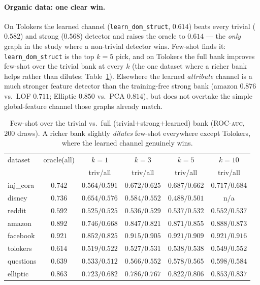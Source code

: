 \documentclass[11pt]{article}
\newcommand{\auc}{\textsc{auc}}
\begin{document}
\paragraph{Organic data: one clear win.} On Tolokers the learned channel
(\texttt{learn\_dom\_struct}, $0.614$) beats every trivial ($0.582$) and strong ($0.568$)
detector and raises the oracle to $0.614$ --- the \emph{only} graph in the study where a
non-trivial detector wins. Few-shot finds it: \texttt{learn\_dom\_struct} is the top $k{=}5$
pick, and on Tolokers the full bank improves few-shot over the trivial bank at every $k$ (the
one dataset where a richer bank helps rather than dilutes; Table~\ref{tab:fewshotbank}).
Elsewhere the learned \emph{attribute} channel is a much stronger feature detector than the
training-free strong bank (amazon $0.876$ vs.\ LOF $0.711$; Elliptic $0.850$ vs.\ PCA $0.814$),
but does not overtake the simple global-feature channel those graphs already match.

\begin{table}[t]
\centering
\caption{Few-shot over the trivial vs.\ full (trivial$+$strong$+$learned) bank (ROC-\auc{},
$200$ draws). A richer bank slightly \emph{dilutes} few-shot everywhere except Tolokers, where
the learned channel genuinely wins.}
\label{tab:fewshotbank}
\begin{tabular}{lccccc}
\toprule
dataset & oracle(all) & $k{=}1$ & $k{=}3$ & $k{=}5$ & $k{=}10$ \\
        &             & triv/all & triv/all & triv/all & triv/all \\
\midrule
inj\_cora & $0.742$ & $0.564/0.591$ & $0.672/0.625$ & $0.687/0.662$ & $0.717/0.684$ \\
disney   & $0.736$ & $0.654/0.576$ & $0.584/0.552$ & $0.488/0.501$ & n/a \\
reddit   & $0.592$ & $0.525/0.525$ & $0.536/0.529$ & $0.537/0.532$ & $0.552/0.537$ \\
amazon   & $0.892$ & $0.746/0.668$ & $0.847/0.821$ & $0.871/0.855$ & $0.888/0.873$ \\
facebook & $0.921$ & $0.852/0.825$ & $0.915/0.905$ & $0.921/0.909$ & $0.921/0.916$ \\
tolokers & $0.614$ & $0.519/0.522$ & $0.527/\mathbf{0.531}$ & $0.538/0.538$ & $0.549/\mathbf{0.552}$ \\
questions & $0.639$ & $0.533/0.512$ & $0.566/0.552$ & $0.578/0.565$ & $0.598/0.584$ \\
elliptic & $0.863$ & $0.723/0.682$ & $0.786/0.767$ & $0.822/0.806$ & $0.853/0.837$ \\
\bottomrule
\end{tabular}
\end{table}
\end{document}
